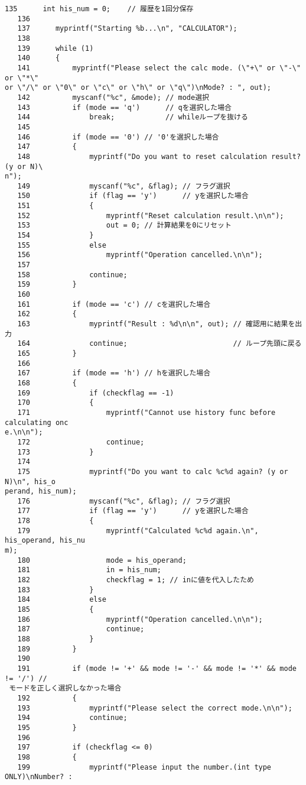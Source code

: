 \begin{Verbatim}[fontsize=\small, baselinestretch=0.8]
   135	    int his_num = 0;    // 履歴を1回分保存
   136	
   137	    myprintf("Starting %b...\n", "CALCULATOR");
   138	
   139	    while (1)
   140	    {
   141	        myprintf("Please select the calc mode. (\"+\" or \"-\" or \"*\" 
or \"/\" or \"0\" or \"c\" or \"h\" or \"q\")\nMode? : ", out);
   142	        myscanf("%c", &mode); // mode選択
   143	        if (mode == 'q')      // qを選択した場合
   144	            break;            // whileループを抜ける
   145	
   146	        if (mode == '0') // '0'を選択した場合
   147	        {
   148	            myprintf("Do you want to reset calculation result? (y or N)\
n");
   149	            myscanf("%c", &flag); // フラグ選択
   150	            if (flag == 'y')      // yを選択した場合
   151	            {
   152	                myprintf("Reset calculation result.\n\n");
   153	                out = 0; // 計算結果を0にリセット
   154	            }
   155	            else
   156	                myprintf("Operation cancelled.\n\n");
   157	
   158	            continue;
   159	        }
   160	
   161	        if (mode == 'c') // cを選択した場合
   162	        {
   163	            myprintf("Result : %d\n\n", out); // 確認用に結果を出力
   164	            continue;                         // ループ先頭に戻る
   165	        }
   166	
   167	        if (mode == 'h') // hを選択した場合
   168	        {
   169	            if (checkflag == -1)
   170	            {
   171	                myprintf("Cannot use history func before calculating onc
e.\n\n");
   172	                continue;
   173	            }
   174	
   175	            myprintf("Do you want to calc %c%d again? (y or N)\n", his_o
perand, his_num);
   176	            myscanf("%c", &flag); // フラグ選択
   177	            if (flag == 'y')      // yを選択した場合
   178	            {
   179	                myprintf("Calculated %c%d again.\n", his_operand, his_nu
m);
   180	                mode = his_operand;
   181	                in = his_num;
   182	                checkflag = 1; // inに値を代入したため
   183	            }
   184	            else
   185	            {
   186	                myprintf("Operation cancelled.\n\n");
   187	                continue;
   188	            }
   189	        }
   190	
   191	        if (mode != '+' && mode != '-' && mode != '*' && mode != '/') //
 モードを正しく選択しなかった場合
   192	        {
   193	            myprintf("Please select the correct mode.\n\n");
   194	            continue;
   195	        }
   196	
   197	        if (checkflag <= 0)
   198	        {
   199	            myprintf("Please input the number.(int type ONLY)\nNumber? :

\end{Verbatim}
